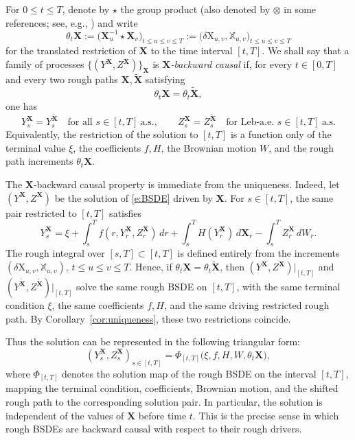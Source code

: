 \documentclass[11pt,reqno]{amsart}
\numberwithin{equation}{section}
\begin{document}
For \(0\le t\le T\), denote by $\star$ the group product (also denoted by $\otimes$ in some references; see, e.g., \cite[Chapter~7.2.1]{friz2010multidimensional}) and write
\[
\theta_t\mathbf X
:=
\big(\mathbf X_u^{-1}\star \mathbf X_v\big)_{t\le u\le v\le T}
:=
\big(\delta \mathrm X_{u,v},\mathbb X_{u,v}\big)_{t\le u\le v\le T}
\]
for the translated restriction of \(\mathbf X\) to the time interval
\([t,T]\).  We shall say that a family of processes
\(\{(Y^{\mathbf X},Z^{\mathbf X})\}_{\mathbf X}\) is
\emph{\(\mathbf X\)-backward causal} if, for every \(t\in[0,T]\) and every two
rough paths \(\mathbf X,\widetilde{\mathbf X}\) satisfying
\[
\theta_t\mathbf X=\theta_t\widetilde{\mathbf X},
\]
one has
\[
Y_s^{\mathbf X}=Y_s^{\widetilde{\mathbf X}}
\quad\text{for all }s\in[t,T]\ \text{a.s.},
\qquad
Z_s^{\mathbf X}=Z_s^{\widetilde{\mathbf X}}
\quad\text{for Leb-a.e. }s\in[t,T]\ \text{a.s.}
\]
Equivalently, the restriction of the solution to \([t,T]\) is a function only
of the terminal value \(\xi\), the coefficients \(f,H\), the Brownian motion
\(W\), and the rough path increments \(\theta_t\mathbf X\).

The $\mathbf X$-backward causal property is immediate from the uniqueness. Indeed, let
\((Y^{\mathbf X},Z^{\mathbf X})\) be the solution of \eqref{e:BSDE} driven by
\(\mathbf X\).  For \(s\in[t,T]\), the same pair restricted to \([t,T]\)
satisfies
\[
Y_s^{\mathbf X}
=
\xi
+\int_s^T f(r,Y_r^{\mathbf X},Z_r^{\mathbf X})\,dr
+\int_s^T H(Y_r^{\mathbf X})\,d\mathbf X_r
-\int_s^T Z_r^{\mathbf X}\,dW_r .
\]
The rough integral over \([s,T]\subset[t,T]\) is defined entirely from the
increments \((\delta \mathrm X_{u,v},\mathbb X_{u,v})\), \(t\le u\le v\le T\).  Hence,
if \(\theta_t\mathbf X=\theta_t\widetilde{\mathbf X}\), then
\((Y^{\mathbf X},Z^{\mathbf X})|_{[t,T]}\) and
\((Y^{\widetilde{\mathbf X}},Z^{\widetilde{\mathbf X}})|_{[t,T]}\) solve the
same rough BSDE on \([t,T]\), with the same terminal condition \(\xi\), the
same coefficients \(f,H\), and the same driving restricted rough path.  By
Corollary~\ref{cor:uniqueness}, these two restrictions coincide.

Thus the solution can be represented in the following triangular form: 
\[
(Y_s^{\mathbf X},Z_s^{\mathbf X})_{s\in[t,T]}
=
\Phi_{[t,T]}\big(\xi,f,H,W,\theta_t\mathbf X\big),
\]
where \(\Phi_{[t,T]}\) denotes the solution map of the rough BSDE on the interval \([t,T]\), mapping the terminal condition, coefficients, Brownian motion, and the shifted rough path to the corresponding solution pair. In particular,
the solution is independent of the values of \(\mathbf X\) before time \(t\).  This is
the precise sense in which rough BSDEs are backward causal with respect to their rough
drivers. 
\end{document}

